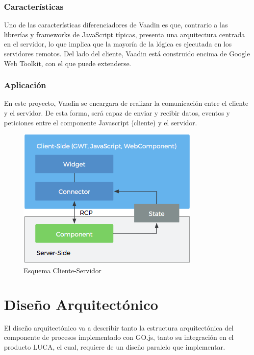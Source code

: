 \documentclass[a4paper,12pt]{article}
\begin{document}
 			\subsubsection{Características}
 				Uno de las características diferenciadores de Vaadin es que, contrario a las librerías y frameworks de JavaScript típicas, presenta una arquitectura centrada en el servidor, lo que implica que la mayoría de la lógica es ejecutada en los servidores remotos. Del lado del cliente, Vaadin está construido encima de Google Web Toolkit, con el que puede extenderse.
 	
 			\subsubsection{Aplicación}
 				En este proyecto, Vaadin se encargara de realizar la comunicación entre el cliente y el servidor. De esta forma, será capaz de enviar y recibir datos, eventos y peticiones entre el componente Javascript (cliente) y el servidor.
 			
 			
	 			\begin{figure}[h]
	 				\centering
	 				\includegraphics[scale=1.5]{schema.png}
	 				\caption{Esquema Cliente-Servidor}\label{fig:schema}
	 			\end{figure}
 			
 		
	
	\afterpage{\null\newpage}
	\newpage
	
	\section{Diseño Arquitectónico}
	
	El diseño arquitectónico va a describir tanto la estructura arquitectónica del componente de procesos implementado con GO.js, tanto su integración en el producto LUCA, el cual, requiere de un diseño paralelo que implementar.
	
\end{document}
